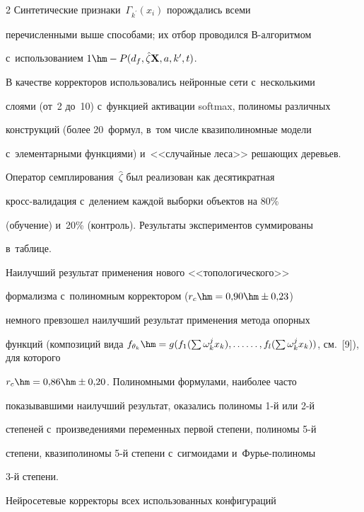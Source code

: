 \begin{multicols}{2}
Синтетические признаки~$\Gamma_{k^\prime}(x_i)$ по\-рож\-да\-лись всеми 

перечисленными выше способами; их отбор проводился В-ал\-го\-рит\-мом 

с~использованием $1\hm- {P}(d_f, \hat{\zeta}\mathbf{X}, a, 

     k^\prime, t)$. 

     

     В качестве корректоров использовались нейронные сети с~несколькими 

слоями (от~2 до~10) с~функцией активации softmax, полиномы различных 

конструкций (более 20~формул, в~том числе квазиполиномные модели 

с~элементарными функциями) и~<<случайные леса>> решающих деревьев. 

Оператор семплирования~$\hat{\zeta}$ был реализован как десятикратная  

кросс-ва\-ли\-да\-ция с~делением каждой выборки объектов на 80\% 

(обучение) и~20\% (конт\-роль). Результаты экспериментов суммированы 

в~таблице.

     



     

     Наилучший результат применения нового <<топологического>> 

формализма с~полиномным корректором ($r_c\hm=0{,}90\hm\pm0{,}23$) 

немного превзошел наилучший результат применения \mbox{метода} опорных 

функций (композиций вида $f_{\theta_k} \hm= g(f_1(\sum \omega_k^j x_k), 

\ldots\linebreak \ldots , f_l(\sum \omega_k^j x_k))$, см.~[9]), для которого 

$r_c\hm=0{,}86\hm\pm0{,}20$. Полиномными формулами, наиболее часто 

показывавшими наилучший результат, оказались полиномы 1-й или 2-й 

степеней с~произведениями переменных первой степени, полиномы 5-й 

степени, квазиполиномы 5-й степени с~сигмоидами и~Фурье-по\-ли\-но\-мы  

3-й степени.

     

     Нейросетевые корректоры всех использованных конфигураций 


\end{multicols}
